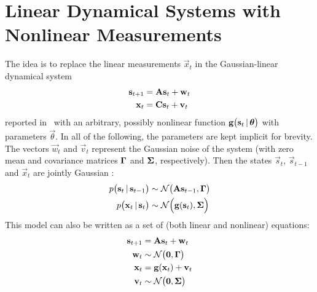 \section{Linear Dynamical Systems with Nonlinear Measurements}
	The idea is to replace the linear measurements \( \vec{x}_t \) in the Gaussian-linear dynamical system
	\begin{align*}
		\vec{s}_{t + 1} & = \mat{A} \vec{s}_t + \vec{w}_t \\
		\vec{x}_t       & = \mat{C} \vec{s}_t + \vec{v}_t
	\end{align*}
	reported in~\cite{ghahramaniParameterEstimationLinear1996} with an arbitrary, possibly nonlinear function \( \vec{g}\paren{\vec{s}_t \given \vec{\theta}} \) with parameters \( \vec{\theta} \). In all of the following, the parameters are kept implicit for brevity. The vectors \( \vec{w}_t \) and \( \vec{v}_t \)	represent the Gaussian noise of the system (with zero mean and covariance matrices \( \mat{\Gamma} \) and \( \mat{\Sigma} \), respectively). Then the states \( \vec{s}_t \), \( \vec{s}_{t - 1} \) and \( \vec{x}_t \) are jointly Gaussian \cite{minkaHiddenMarkovModels1999}:
	\begin{align*}
		p\paren{\vec{s}_t \given \vec{s}_{t - 1}} &\sim \normal\paren{\mat{A} \vec{s}_{t - 1}, \mat{\Gamma}} \\
		p\paren{\vec{x}_t \given \vec{s}_t}       &\sim \normal\paren{\vec{g}\paren{\vec{s}_t}, \mat{\Sigma}}
	\end{align*}
	This model can also be written as a set of (both linear and nonlinear) equations:
	\begin{align*}
		\vec{s}_{t + 1} & =    \mat{A} \vec{s}_t + \vec{w}_t          \\
		\vec{w}_t       & \sim \normal\paren{\vec{0}, \mat{\Gamma}}   \\
		\vec{x}_t       & =    \vec{g}\paren{\vec{x}_t} + \vec{v}_t \\
		\vec{v}_t       & \sim \normal\paren{\vec{0}, \mat{\Sigma}}
	\end{align*}

